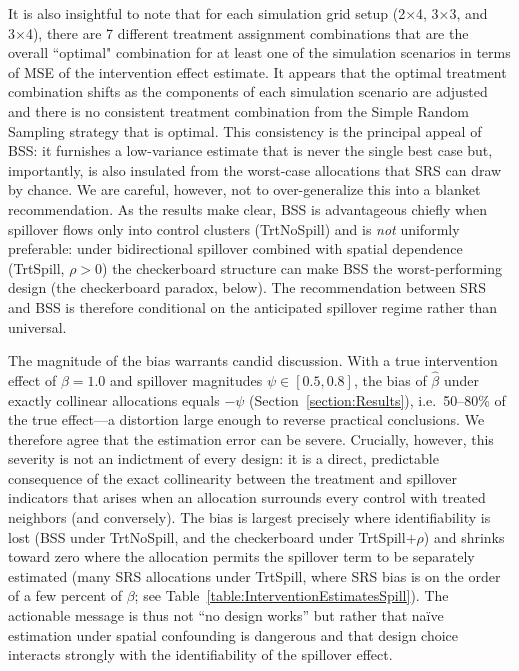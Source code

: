 \documentclass{article}[11pt]
\begin{document}
It is also insightful to note that for each simulation grid setup (2×4, 3×3, and 3×4), there are 7 different treatment assignment combinations that are the overall ``optimal" combination for at least one of the simulation scenarios in terms of MSE of the intervention effect estimate. It appears that the optimal treatment combination shifts as the components of each simulation scenario are adjusted and there is no consistent treatment combination from the Simple Random Sampling strategy that is optimal. This consistency is the principal appeal of BSS: it furnishes a low-variance estimate that is never the single best case but, importantly, is also insulated from the worst-case allocations that SRS can draw by chance. We are careful, however, not to over-generalize this into a blanket recommendation. As the results make clear, BSS is advantageous chiefly when spillover flows only into control clusters (TrtNoSpill) and is \emph{not} uniformly preferable: under bidirectional spillover combined with spatial dependence (TrtSpill, $\rho > 0$) the checkerboard structure can make BSS the worst-performing design (the checkerboard paradox, below). The recommendation between SRS and BSS is therefore conditional on the anticipated spillover regime rather than universal.

The magnitude of the bias warrants candid discussion. With a true intervention effect of $\beta = 1.0$ and spillover magnitudes $\psi \in [0.5, 0.8]$, the bias of $\hat{\beta}$ under exactly collinear allocations equals $-\psi$ (Section~\ref{section:Results}), i.e.\ 50--80\% of the true effect---a distortion large enough to reverse practical conclusions. We therefore agree that the estimation error can be severe. Crucially, however, this severity is not an indictment of every design: it is a direct, predictable consequence of the exact collinearity between the treatment and spillover indicators that arises when an allocation surrounds every control with treated neighbors (and conversely). The bias is largest precisely where identifiability is lost (BSS under TrtNoSpill, and the checkerboard under TrtSpill$+\rho$) and shrinks toward zero where the allocation permits the spillover term to be separately estimated (many SRS allocations under TrtSpill, where SRS bias is on the order of a few percent of $\beta$; see Table~\ref{table:InterventionEstimatesSpill}). The actionable message is thus not ``no design works'' but rather that naïve estimation under spatial confounding is dangerous and that design choice interacts strongly with the identifiability of the spillover effect.
\end{document}
